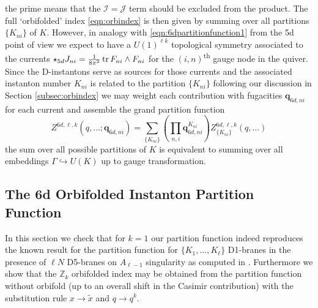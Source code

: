 \documentclass[main.tex]{subfiles}
\begin{document}
the prime means that the $\mathcal{I}=\mathcal{J}$ term should be excluded from the product.
The full `orbifolded' index \eqref{eqn:orbindex} is then given by summing over all partitions $\{K_{ni}\}$ of $K$. However, in analogy with \eqref{eqn:6dpartitionfunction1} from the 5d point of view we expect to have a $U(1)^{\ell k}$ topological symmetry associated to the currents $\star_{5d}J_{ni}=\frac{1}{8\pi^2}\operatorname{tr} F_{ni}\wedge F_{ni}$ for the $(i,n)$\textsuperscript{th} gauge node in the quiver. Since the D-instantons serve as sources for those currents and the associated instanton number $K_{ni}$ is related to the partition $\{K_{ni}\}$ following our discussion in Section \ref{subsec:orbindex} we may weight each contribution with fugacities $\mathbf{q}_{6d,ni}$ for each current and assemble the grand partition function
\begin{equation}
\label{eqn:lkpartitionfunction}
Z^{6d,\ell,k}(q,\dots;\mathbf{q}_{6d,ni})=\sum_{\{K_{ni}\}}\left(\prod_{n,i}\mathbf{q}_{6d,ni}^{K_{ni}}\right)Z^{6d,\ell,k}_{\{K_{ni}\}}(q,\dots)
\end{equation}
the sum over all possible partitions of $K$ is equivalent to summing over all embeddings $\Gamma\hookrightarrow U(K)$ up to gauge transformation.

\subsection{The 6d Orbifolded Instanton Partition Function}
In this section we check that for $k=1$ our partition function indeed reproduces the known result for the partition function for $\{K_1,\dots,K_{\ell}\}$ D1-branes in the presence of $\ell N$ D5-branes on $A_{\ell-1}$ singularity as computed in \cite{Gadde:2015tra}. Furthermore we show that the $\mathbb{Z}_k$ orbifolded index may be obtained from the partition function without orbifold (up to an overall shift in the Casimir contribution) with the substitution rule $x\to\tilde{x}$ and $q\to q^k$.
\end{document}
